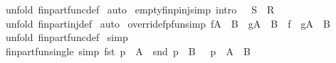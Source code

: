 \begin{isabellebody}
\ {\isacharparenleft}unfold\ fin{\isacharunderscore}part{\isacharunderscore}func{\isacharunderscore}def{\isacharparenright}\isanewline
{}\isamarkupfalse%
\ auto\isanewline
{}\isamarkupfalse%
%
\endisatagproof
{\isafoldproof}%
%
\isadelimproof
\isanewline
%
\endisadelimproof
\isanewline
{}\isamarkupfalse%
\ empty{\isacharunderscore}fin{\isacharunderscore}pinj{\isacharbrackleft}simp{\isacharcomma}\ intro{\isacharbang}{\isacharbrackright}{\isacharcolon}\ {\isachardoublequoteopen}{\isacharbraceleft}{\isacharbraceright}\ {\isacharcolon}\ {\isacharparenleft}S\ {\isachargreater}{\isacharminus}{\isacharbar}{\isacharbar}{\isacharminus}{\isachargreater}\ R{\isacharparenright}{\isachardoublequoteclose}\isanewline
%
\isadelimproof
%
\endisadelimproof
%
\isatagproof
{}\isamarkupfalse%
\ {\isacharparenleft}unfold\ fin{\isacharunderscore}part{\isacharunderscore}inj{\isacharunderscore}def{\isacharparenright}\isanewline
{}\isamarkupfalse%
\ auto\isanewline
{}\isamarkupfalse%
%
\endisatagproof
{\isafoldproof}%
%
\isadelimproof
\isanewline
%
\endisadelimproof
\isanewline
{}\isamarkupfalse%
\ override{\isacharunderscore}fpfun{\isacharbrackleft}simp{\isacharbrackright}{\isacharcolon}\ {\isachardoublequoteopen}{\isacharbrackleft}{\isacharbar}f{\isacharcolon}{\isacharparenleft}A\ {\isacharminus}{\isacharbar}{\isacharbar}{\isacharminus}{\isachargreater}\ B{\isacharparenright}\ {\isacharsemicolon}\ g{\isacharcolon}{\isacharparenleft}A\ {\isacharminus}{\isacharbar}{\isacharbar}{\isacharminus}{\isachargreater}\ B{\isacharparenright}{\isacharbar}{\isacharbrackright}\ {\isacharequal}{\isacharequal}{\isachargreater}\ {\isacharparenleft}{\isacharparenleft}f\ {\isacharparenleft}{\isacharplus}{\isacharparenright}\ g{\isacharparenright}{\isacharcolon}{\isacharparenleft}A\ {\isacharminus}{\isacharbar}{\isacharbar}{\isacharminus}{\isachargreater}\ B{\isacharparenright}{\isacharparenright}{\isachardoublequoteclose}\isanewline
%
\isadelimproof
%
\endisadelimproof
%
\isatagproof
{}\isamarkupfalse%
\ {\isacharparenleft}unfold\ fin{\isacharunderscore}part{\isacharunderscore}func{\isacharunderscore}def{\isacharparenright}\isanewline
{}\isamarkupfalse%
\ simp\isanewline
{}\isamarkupfalse%
%
\endisatagproof
{\isafoldproof}%
%
\isadelimproof
\isanewline
%
\endisadelimproof
\isanewline
{}\isamarkupfalse%
\ fin{\isacharunderscore}part{\isacharunderscore}fun{\isacharunderscore}single\ {\isacharbrackleft}simp{\isacharbrackright}{\isacharcolon}\ {\isachardoublequoteopen}{\isacharbrackleft}{\isacharbar}fst\ p\ {\isacharcolon}\ A\ {\isacharsemicolon}\ snd\ p\ {\isacharcolon}\ B\ {\isacharbar}{\isacharbrackright}\ {\isacharequal}{\isacharequal}{\isachargreater}\ {\isacharbraceleft}p{\isacharbraceright}\ {\isacharcolon}\ {\isacharparenleft}A\ {\isacharminus}{\isacharbar}{\isacharbar}{\isacharminus}{\isachargreater}\ B{\isacharparenright}{\isachardoublequoteclose}\isanewline

\end{isabellebody}
